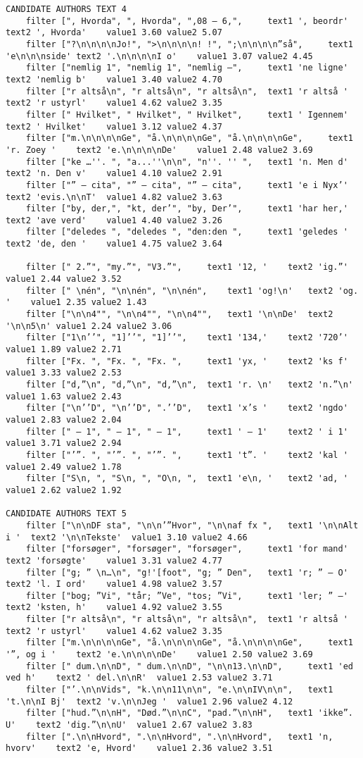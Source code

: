 {\begin{verbatim}
CANDIDATE AUTHORS TEXT 4
	filter [", Hvorda", ", Hvorda", ",08 – 6,", 	text1 ', beordr'	text2 ', Hvorda'	value1 3.60	value2 5.07
	filter ["?\n\n\n\nJo!", ">\n\n\n\n! !", ";\n\n\n\n”så", 	text1 'e\n\n\nside'	text2 '.\n\n\n\nI o'	value1 3.07	value2 4.45
	filter ["nemlig 1", "nemlig 1", "nemlig –", 	text1 'ne ligne'	text2 'nemlig b'	value1 3.40	value2 4.70
	filter ["r altså\n", "r altså\n", "r altså\n", 	text1 'r altså '	text2 'r ustyrl'	value1 4.62	value2 3.35
	filter [" Hvilket", " Hvilket", " Hvilket", 	text1 ' Igennem'	text2 ' Hvilket'	value1 3.12	value2 4.37
	filter ["m.\n\n\n\nGe", "å.\n\n\n\nGe", "å.\n\n\n\nGe", 	text1 'r. Zoey '	text2 'e.\n\n\n\nDe'	value1 2.48	value2 3.69
	filter ["ke …''. ", "a...''\n\n", "n''. '' ", 	text1 'n. Men d'	text2 'n. Den v'	value1 4.10	value2 2.91
	filter ["” – cita", "” – cita", "” – cita", 	text1 'e i Nyx’'	text2 'evis.\n\nT'	value1 4.82	value2 3.63
	filter ["by, der,", "kt, der’", "by, Der’", 	text1 'har her,'	text2 'ave verd'	value1 4.40	value2 3.26
	filter ["deledes ", "deledes ", "den:den ", 	text1 'geledes '	text2 'de, den '	value1 4.75	value2 3.64

	filter [" 2.”", "my.”", "V3.”", 	text1 '12, '	text2 'ig.”'	value1 2.44	value2 3.52
	filter [" \nén", "\n\nén", "\n\nén", 	text1 'og!\n'	text2 'og. '	value1 2.35	value2 1.43
	filter ["\n\n4"", "\n\n4"", "\n\n4"", 	text1 '\n\nDe'	text2 '\n\n5\n'	value1 2.24	value2 3.06
	filter ["1\n’’", "1]’’", "1]’’", 	text1 '134,'	text2 '720’'	value1 1.89	value2 2.71
	filter ["Fx. ", "Fx. ", "Fx. ", 	text1 'yx, '	text2 'ks f'	value1 3.33	value2 2.53
	filter ["d,”\n", "d,”\n", "d,”\n", 	text1 'r. \n'	text2 'n.”\n'	value1 1.63	value2 2.43
	filter ["\n’’D", "\n’’D", ".’’D", 	text1 'x’s '	text2 'ngdo'	value1 2.83	value2 2.04
	filter [" – 1", " – 1", " – 1", 	text1 ' – 1'	text2 ' i 1'	value1 3.71	value2 2.94
	filter ["’”. ", "’”. ", "’”. ", 	text1 't”. '	text2 'kal '	value1 2.49	value2 1.78
	filter ["S\n, ", "S\n, ", "O\n, ", 	text1 'e\n, '	text2 'ad, '	value1 2.62	value2 1.92

CANDIDATE AUTHORS TEXT 5
	filter ["\n\nDF sta", "\n\n’”Hvor", "\n\naf fx ", 	text1 '\n\nAlt i '	text2 '\n\nTekste'	value1 3.10	value2 4.66
	filter ["forsøger", "forsøger", "forsøger", 	text1 'for mand'	text2 'forsøgte'	value1 3.31	value2 4.77
	filter ["g; ” \n…\n", "g!'[foot", "g; ” Den", 	text1 'r; ” – O'	text2 'l. I ord'	value1 4.98	value2 3.57
	filter ["bog; ”Vi", "tår; ”Ve", "tos; ”Vi", 	text1 'ler; ” –'	text2 'ksten, h'	value1 4.92	value2 3.55
	filter ["r altså\n", "r altså\n", "r altså\n", 	text1 'r altså '	text2 'r ustyrl'	value1 4.62	value2 3.35
	filter ["m.\n\n\n\nGe", "å.\n\n\n\nGe", "å.\n\n\n\nGe", 	text1 '”, og i '	text2 'e.\n\n\n\nDe'	value1 2.50	value2 3.69
	filter [" dum.\n\nD", " dum.\n\nD", "\n\n13.\n\nD", 	text1 'ed ved h'	text2 ' del.\n\nR'	value1 2.53	value2 3.71
	filter ["’.\n\nVids", "k.\n\n11\n\n", "e.\n\nIV\n\n", 	text1 't.\n\nI Bj'	text2 'v.\n\nJeg '	value1 2.96	value2 4.12
	filter ["hud.”\n\nH", "Død.”\n\nC", "pad.”\n\nH", 	text1 'ikke”. U'	text2 'dig.”\n\nU'	value1 2.67	value2 3.83
	filter [".\n\nHvord", ".\n\nHvord", ".\n\nHvord", 	text1 'n, hvorv'	text2 'e, Hvord'	value1 2.36	value2 3.51


\end{verbatim}}
